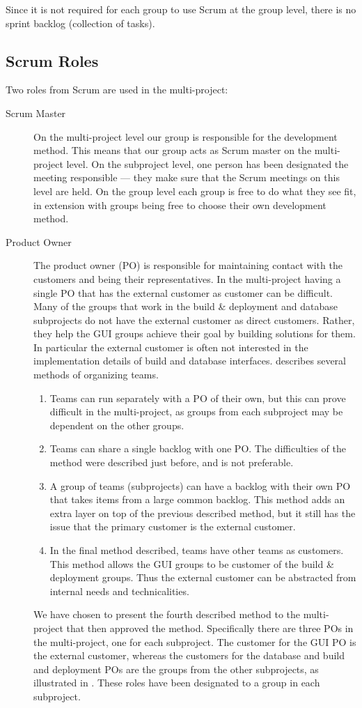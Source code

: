Since it is not required for each group to use Scrum at the group level, there is no sprint backlog (collection of tasks).

\subsection{Scrum Roles}
Two roles from Scrum are used in the multi-project:

\begin{description}
  \item[Scrum Master] On the multi-project level our group is responsible for the development method. This means that our group acts as Scrum master on the multi-project level. On the subproject level, one person has been designated the meeting responsible --- they make sure that the Scrum meetings on this level are held. On the group level each group is free to do what they see fit, in extension with groups being free to choose their own development method.
  \item[Product Owner] The product owner (PO) is responsible for maintaining contact with the customers and being their representatives. In the multi-project having a single PO that has the external customer as customer can be difficult. Many of the groups that work in the build \& deployment and database subprojects do not have the external customer as direct customers. Rather, they help the GUI groups achieve their goal by building solutions for them. In particular the external customer is often not interested in the implementation details of build and database interfaces. \textcite{bird_davies_2007} describes several methods of organizing teams.
  \begin{enumerate}
    \item Teams can run separately with a PO of their own, but this can prove difficult in the multi-project, as groups from each subproject may be dependent on the other groups.
    \item Teams can share a single backlog with one PO. The difficulties of the method were described just before, and is not preferable.
    \item A group of teams (subprojects) can have a backlog with their own PO that takes items from a large common backlog. This method adds an extra layer on top of the previous described method, but it still has the issue that the primary customer is the external customer.
    \item In the final method described, teams have other teams as customers. This method allows the GUI groups to be customer of the build \& deployment groups. Thus the external customer can be abstracted from internal needs and technicalities.
  \end{enumerate}
  We have chosen to present the fourth described method to the multi-project that then approved the method. Specifically there are three POs in the multi-project, one for each subproject. The customer for the GUI PO is the external customer, whereas the customers for the database and build and deployment POs are the groups from the other subprojects, as illustrated in . These roles have been designated to a group in each subproject.
\end{description}

